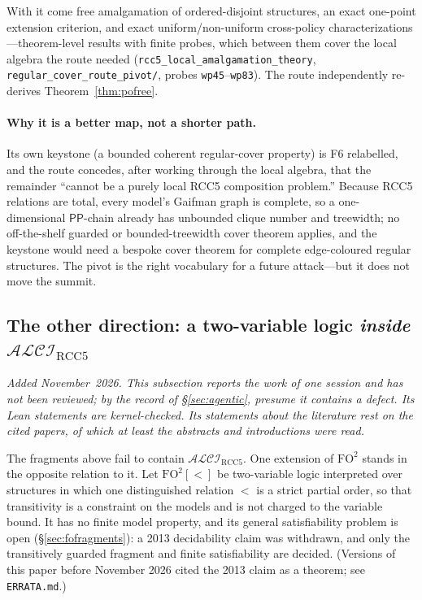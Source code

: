 \documentclass[11pt]{article}
\newcommand{\ALCIRCC}[1]{\mathcal{ALCI}_{\mathrm{RCC#1}}}
\newcommand{\PP}{\mathsf{PP}}
\theoremstyle{plain}
\theoremstyle{definition}
\begin{document}
With it come free amalgamation of ordered-disjoint structures, an exact
one-point extension criterion, and exact uniform/non-uniform cross-policy
characterizations---theorem-level results with finite probes, which
between them cover the local algebra the route needed
(\texttt{rcc5\_local\_amalgamation\_theory},
\texttt{regular\_cover\_route\_pivot/}, probes \texttt{wp45}--\texttt{wp83}).
The route independently re-derives Theorem~\ref{thm:pofree}.

\paragraph{Why it is a better map, not a shorter path.} Its own keystone
(a bounded coherent regular-cover property) is F6 relabelled, and the
route concedes, after working through the local algebra, that the remainder
``cannot be a purely local RCC5 composition problem.'' Because RCC5
relations are total, every model's Gaifman graph is complete, so a
one-dimensional $\PP$-chain already has unbounded clique number and
treewidth; no off-the-shelf guarded or bounded-treewidth cover theorem
applies, and the keystone would need a bespoke cover theorem for complete
edge-coloured regular structures. The pivot is the right vocabulary for a
future attack---but it does not move the summit.


\subsection{The other direction: a two-variable logic \emph{inside} \texorpdfstring{$\ALCIRCC5$}{ALCI\_RCC5}}
\label{ssec:bridge}

\emph{Added November~2026. This subsection reports the work of one session
and has not been reviewed; by the record of \S\ref{sec:agentic}, presume it
contains a defect. Its Lean statements are kernel-checked. Its statements
about the literature rest on the cited papers, of which at least the abstracts
and introductions were read.}

The fragments above fail to contain $\ALCIRCC5$. One extension of
$\mathrm{FO}^2$ stands in the opposite relation to it. Let
$\mathrm{FO}^2[<]$ be two-variable logic interpreted over structures in which
one distinguished relation $<$ is a strict partial order, so that transitivity
is a constraint on the models and is not charged to the variable bound. It has
no finite model property, and its general satisfiability problem is open
(\S\ref{sec:fofragments}): a 2013 decidability claim was withdrawn, and only
the transitively guarded fragment and finite satisfiability are decided.
(Versions of this paper before November 2026 cited the 2013 claim as a
theorem; see \texttt{ERRATA.md}.)
\end{document}
